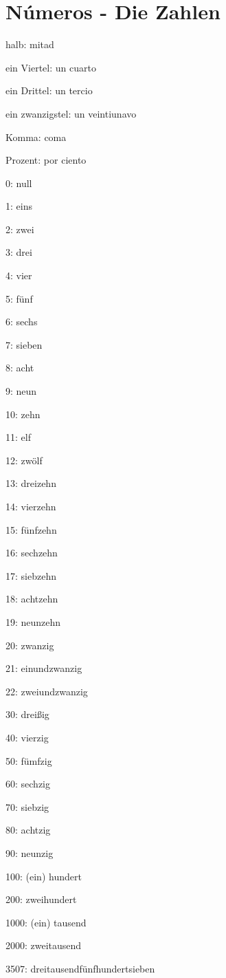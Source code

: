 \section{Números - Die Zahlen}
\begin{multicols}{2}
\begin{myitemize}
\item halb: mitad
\item ein Viertel: un cuarto
\item ein Drittel: un tercio
\item ein zwanzigstel: un veintiunavo
\item Komma: coma
\item Prozent: por ciento
\item 0: null
\item 1: eins
\item 2: zwei
\item 3: drei
\item 4: vier
\item 5: fünf
\item 6: sechs
\item 7: sieben
\item 8: acht
\item 9: neun
\item 10: zehn
\item 11: elf
\item 12: zwölf
\item 13: dreizehn
\item 14: vierzehn
\item 15: fünfzehn
\item 16: sechzehn
\item 17: siebzehn
\item 18: achtzehn
\item 19: neunzehn
\item 20: zwanzig
\item 21: einundzwanzig
\item 22: zweiundzwanzig
\item 30: dreißig
\item 40: vierzig
\item 50: fümfzig
\item 60: sechzig
\item 70: siebzig
\item 80: achtzig
\item 90: neunzig
\item 100: (ein) hundert
\item 200: zweihundert
\item 1000: (ein) tausend
\item 2000: zweitausend
\item 3507: dreitausendfünfhundertsieben
\end{myitemize}
\end{multicols}

